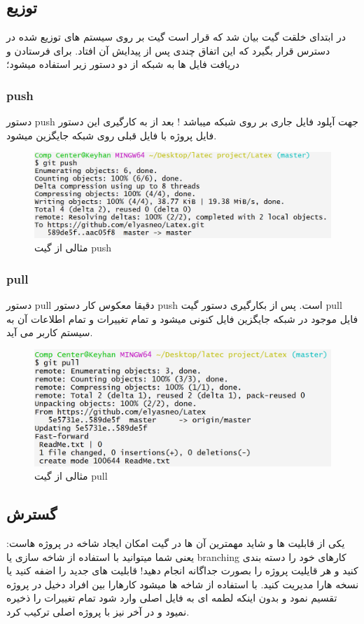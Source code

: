 \subsection{توزیع}
در ابتدای خلقت گیت بیان شد که قرار است گیت بر روی سیستم های توزیع شده در دسترس قرار بگیرد که این اتفاق چندی پس از پیدایش آن افتاد. برای فرستادن و دریافت فایل ها به شبکه از دو دستور زیر استفاده میشود؛
\subsubsection{push}
دستور push جهت آپلود فایل جاری بر روی شبکه میباشد ! \newline
بعد از به کارگیری این دستور فایل پروژه با فایل قبلی روی شبکه جایگزین میشود.
\begin{figure}[tbh]
	\centering
	\includegraphics[width=1\textwidth]{./Figures/GitPush}
	\caption{ مثالی از گیت push }
	\label{Fig:GitPush}
\end{figure}
\subsubsection{pull}
دستور pull دقیقا معکوس کار دستور push است. \newline
پس از بکارگیری دستور گیت pull فایل موجود در شبکه جایگزین فایل کنونی میشود و تمام تغییرات و تمام اطلاعات آن به سیستم کاربر می آید.
\begin{figure}[tbh]
	\centering
	\includegraphics[width=1\textwidth]{./Figures/GitPull}
	\caption{ مثالی از گیت pull }
	\label{Fig:GitPull}
\end{figure}

\subsection{ گسترش }
یکی از قابلیت ها و شاید مهمترین آن ها در گیت امکان ایجاد شاخه در پروژه هاست: یعنی شما میتوانید با استفاده از شاخه سازی یا branching کارهای خود را دسته بندی کنید و هر قایلیت پروژه را بصورت جداگانه انجام دهید! قابلیت های جدید را اضفه کنید یا نسخه هارا مدیریت کنید. \newline
با استفاده از شاخه ها میشود کارهارا بین افراد دخیل در پروژه تقسیم نمود و بدون اینکه لطمه ای به فایل اصلی وارد شود تمام تغییرات را ذخیره نمیود و در آخر نیز با پروژه اصلی ترکیب کرد.

